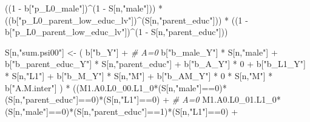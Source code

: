 \documentclass[
]{book}
\newenvironment{Shaded}{\begin{snugshade}}{\end{snugshade}}
\newcommand{\CommentTok}[1]{\textcolor[rgb]{0.56,0.35,0.01}{\textit{#1}}}
\newcommand{\DecValTok}[1]{\textcolor[rgb]{0.00,0.00,0.81}{#1}}
\newcommand{\NormalTok}[1]{#1}
\newcommand{\OtherTok}[1]{\textcolor[rgb]{0.56,0.35,0.01}{#1}}
\newcommand{\SpecialCharTok}[1]{\textcolor[rgb]{0.00,0.00,0.00}{#1}}
\newcommand{\StringTok}[1]{\textcolor[rgb]{0.31,0.60,0.02}{#1}}
\begin{document}
\begin{Shaded}
\begin{Highlighting}[]
\NormalTok{      ((}\DecValTok{1} \SpecialCharTok{{-}}\NormalTok{ b[}\StringTok{"p\_L0\_male"}\NormalTok{])}\SpecialCharTok{\^{}}\NormalTok{(}\DecValTok{1} \SpecialCharTok{{-}}\NormalTok{ S[n,}\StringTok{"male"}\NormalTok{])) }\SpecialCharTok{*} 
\NormalTok{      ((b[}\StringTok{"p\_L0\_parent\_low\_educ\_lv"}\NormalTok{])}\SpecialCharTok{\^{}}\NormalTok{(S[n,}\StringTok{"parent\_educ"}\NormalTok{])) }\SpecialCharTok{*}
\NormalTok{      ((}\DecValTok{1} \SpecialCharTok{{-}}\NormalTok{ b[}\StringTok{"p\_L0\_parent\_low\_educ\_lv"}\NormalTok{])}\SpecialCharTok{\^{}}\NormalTok{(}\DecValTok{1} \SpecialCharTok{{-}}\NormalTok{ S[n,}\StringTok{"parent\_educ"}\NormalTok{])) }
    
\NormalTok{    S[n,}\StringTok{"sum.psi00"}\NormalTok{] }\OtherTok{\textless{}{-}}\NormalTok{  ( b[}\StringTok{"b\_Y"}\NormalTok{] }\SpecialCharTok{+}                                            \CommentTok{\# A=0}
\NormalTok{                             b[}\StringTok{"b\_male\_Y"}\NormalTok{] }\SpecialCharTok{*}\NormalTok{ S[n,}\StringTok{"male"}\NormalTok{] }\SpecialCharTok{+} 
\NormalTok{                             b[}\StringTok{"b\_parent\_educ\_Y"}\NormalTok{] }\SpecialCharTok{*}\NormalTok{ S[n,}\StringTok{"parent\_educ"}\NormalTok{] }\SpecialCharTok{+} 
\NormalTok{                             b[}\StringTok{"b\_A\_Y"}\NormalTok{] }\SpecialCharTok{*} \DecValTok{0} \SpecialCharTok{+} 
\NormalTok{                             b[}\StringTok{"b\_L1\_Y"}\NormalTok{] }\SpecialCharTok{*}\NormalTok{ S[n,}\StringTok{"L1"}\NormalTok{] }\SpecialCharTok{+}
\NormalTok{                             b[}\StringTok{"b\_M\_Y"}\NormalTok{] }\SpecialCharTok{*}\NormalTok{ S[n,}\StringTok{"M"}\NormalTok{] }\SpecialCharTok{+}
\NormalTok{                             b[}\StringTok{"b\_AM\_Y"}\NormalTok{] }\SpecialCharTok{*} \DecValTok{0} \SpecialCharTok{*}\NormalTok{ S[n,}\StringTok{"M"}\NormalTok{] }\SpecialCharTok{*}\NormalTok{ b[}\StringTok{"A.M.inter"}\NormalTok{] ) }\SpecialCharTok{*}
\NormalTok{      ((M1.A0.L0\_00.L1\_0}\SpecialCharTok{*}\NormalTok{(S[n,}\StringTok{"male"}\NormalTok{]}\SpecialCharTok{==}\DecValTok{0}\NormalTok{)}\SpecialCharTok{*}\NormalTok{(S[n,}\StringTok{"parent\_educ"}\NormalTok{]}\SpecialCharTok{==}\DecValTok{0}\NormalTok{)}\SpecialCharTok{*}\NormalTok{(S[n,}\StringTok{"L1"}\NormalTok{]}\SpecialCharTok{==}\DecValTok{0}\NormalTok{) }\SpecialCharTok{+} \CommentTok{\# A\textquotesingle{}=0}
\NormalTok{          M1.A0.L0\_01.L1\_0}\SpecialCharTok{*}\NormalTok{(S[n,}\StringTok{"male"}\NormalTok{]}\SpecialCharTok{==}\DecValTok{0}\NormalTok{)}\SpecialCharTok{*}\NormalTok{(S[n,}\StringTok{"parent\_educ"}\NormalTok{]}\SpecialCharTok{==}\DecValTok{1}\NormalTok{)}\SpecialCharTok{*}\NormalTok{(S[n,}\StringTok{"L1"}\NormalTok{]}\SpecialCharTok{==}\DecValTok{0}\NormalTok{) }\SpecialCharTok{+}

\end{Highlighting}
\end{Shaded}
\end{document}
